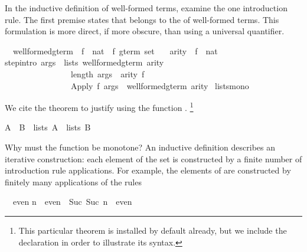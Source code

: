 \begin{isabellebody}
\begin{isamarkuptext}
In the inductive definition of well-formed terms, examine the one
introduction rule.  The first premise states that  belongs to
the  of well-formed terms.  This formulation is more
direct, if more obscure, than using a universal quantifier.%
\end{isamarkuptext}%
\isamarkuptrue%
\isamarkupfalse%
\isanewline
\ \ well{\isacharunderscore}formed{\isacharunderscore}gterm{\isacharprime}\ {\isacharcolon}{\isacharcolon}\ {\isachardoublequoteopen}{\isacharparenleft}{\isacharprime}f\ {\isasymRightarrow}\ nat{\isacharparenright}\ {\isasymRightarrow}\ {\isacharprime}f\ gterm\ set{\isachardoublequoteclose}\isanewline
\ \ \ arity\ {\isacharcolon}{\isacharcolon}\ {\isachardoublequoteopen}{\isacharprime}f\ {\isasymRightarrow}\ nat{\isachardoublequoteclose}\isanewline
{}\isanewline
step{\isacharbrackleft}intro{\isacharbang}{\isacharbrackright}{\isacharcolon}\ {\isachardoublequoteopen}{\isasymlbrakk}args\ {\isasymin}\ lists\ {\isacharparenleft}well{\isacharunderscore}formed{\isacharunderscore}gterm{\isacharprime}\ arity{\isacharparenright}{\isacharsemicolon}\ \ \isanewline
\ \ \ \ \ \ \ \ \ \ \ \ \ \ \ \ length\ args\ {\isacharequal}\ arity\ f{\isasymrbrakk}\isanewline
\ \ \ \ \ \ \ \ \ \ \ \ \ \ \ {\isasymLongrightarrow}\ {\isacharparenleft}Apply\ f\ args{\isacharparenright}\ {\isasymin}\ well{\isacharunderscore}formed{\isacharunderscore}gterm{\isacharprime}\ arity{\isachardoublequoteclose}\isanewline
{}\ lists{\isacharunderscore}mono%
\begin{isamarkuptext}%
We cite the theorem  to justify 
using the function .%
\footnote{This particular theorem is installed by default already, but we
include the  declaration in order to illustrate its syntax.}
\begin{isabelle}%
A\ {\isasymsubseteq}\ B\ {\isasymLongrightarrow}\ lists\ A\ {\isasymsubseteq}\ lists\ B%
\end{isabelle}
Why must the function be monotone?  An inductive definition describes
an iterative construction: each element of the set is constructed by a
finite number of introduction rule applications.  For example, the
elements of  are constructed by finitely many applications of
the rules
\begin{isabelle}%
{}\ {\isasymin}\ even\isasep\isanewline%
n\ {\isasymin}\ even\ {\isasymLongrightarrow}\ Suc\ {\isacharparenleft}Suc\ n{\isacharparenright}\ {\isasymin}\ even%

\end{isabelle}
\end{isamarkuptext}
\end{isabellebody}
